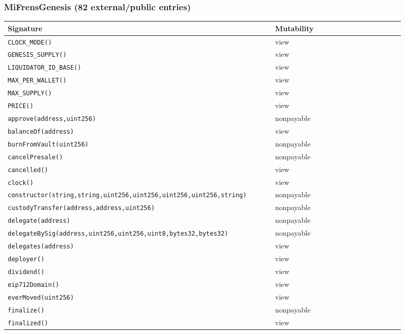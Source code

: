 \subsubsection*{MiFrensGenesis \;\normalfont\small(82 external/public entries)}
\begin{longtable}{@{}p{0.62\linewidth}p{0.30\linewidth}@{}}
\toprule \textbf{Signature} & \textbf{Mutability} \\ \midrule \endhead
\texttt{\scriptsize CLOCK\_MODE()} & view \\
\texttt{\scriptsize GENESIS\_SUPPLY()} & view \\
\texttt{\scriptsize LIQUIDATOR\_ID\_BASE()} & view \\
\texttt{\scriptsize MAX\_PER\_WALLET()} & view \\
\texttt{\scriptsize MAX\_SUPPLY()} & view \\
\texttt{\scriptsize PRICE()} & view \\
\texttt{\scriptsize approve(address,uint256)} & nonpayable \\
\texttt{\scriptsize balanceOf(address)} & view \\
\texttt{\scriptsize burnFromVault(uint256)} & nonpayable \\
\texttt{\scriptsize cancelPresale()} & nonpayable \\
\texttt{\scriptsize cancelled()} & view \\
\texttt{\scriptsize clock()} & view \\
\texttt{\scriptsize constructor(string,string,uint256,uint256,uint256,uint256,string)} & nonpayable \\
\texttt{\scriptsize custodyTransfer(address,address,uint256)} & nonpayable \\
\texttt{\scriptsize delegate(address)} & nonpayable \\
\texttt{\scriptsize delegateBySig(address,uint256,uint256,uint8,bytes32,bytes32)} & nonpayable \\
\texttt{\scriptsize delegates(address)} & view \\
\texttt{\scriptsize deployer()} & view \\
\texttt{\scriptsize dividend()} & view \\
\texttt{\scriptsize eip712Domain()} & view \\
\texttt{\scriptsize everMoved(uint256)} & view \\
\texttt{\scriptsize finalize()} & nonpayable \\
\texttt{\scriptsize finalized()} & view \\

\end{longtable}
